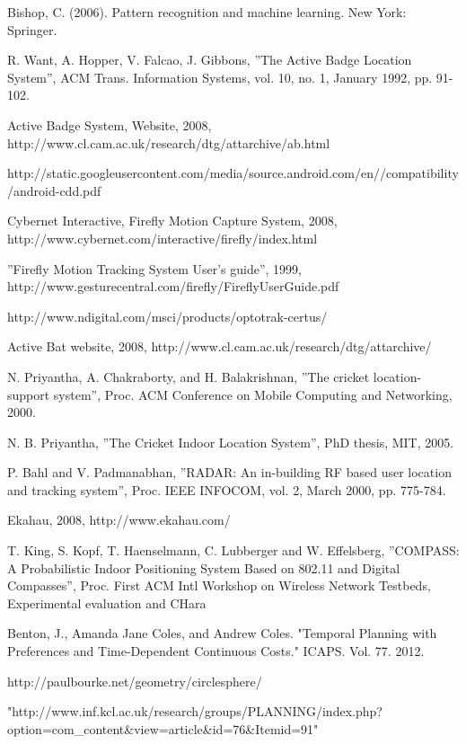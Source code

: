 \documentclass[12pt]{informatics-report}
\begin{document}
\begin{thebibliography}{99}
 Bishop, C. (2006). Pattern recognition and machine learning. New York: Springer.

 R. Want, A. Hopper, V. Falcao, J. Gibbons, ”The Active Badge Location System”, ACM Trans. Information Systems, vol. 10, no. 1, January 1992, pp. 91-102.

 Active Badge System, Website, 2008, http://www.cl.cam.ac.uk/research/dtg/attarchive/ab.html

 http://static.googleusercontent.com/media/source.android.com/en//compatibility/android-cdd.pdf

 Cybernet Interactive, Firefly Motion Capture System, 2008, http://www.cybernet.com/interactive/firefly/index.html 

 ”Firefly Motion Tracking System User’s guide”, 1999, http://www.gesturecentral.com/firefly/FireflyUserGuide.pdf

 http://www.ndigital.com/msci/products/optotrak-certus/

 Active Bat website, 2008, http://www.cl.cam.ac.uk/research/dtg/attarchive/

 N. Priyantha, A. Chakraborty, and H. Balakrishnan, ”The cricket location- support system”, Proc. ACM Conference on Mobile Computing and Networking, 2000. 

 N. B. Priyantha, ”The Cricket Indoor Location System”, PhD thesis, MIT, 2005.

 P. Bahl and V. Padmanabhan, ”RADAR: An in-building RF based user location and tracking system”, Proc. IEEE INFOCOM, vol. 2, March 2000, pp. 775-784.

 Ekahau, 2008, http://www.ekahau.com/

 T. King, S. Kopf, T. Haenselmann, C. Lubberger and W. Effelsberg, ”COMPASS: A Probabilistic Indoor Positioning System Based on 802.11 and Digital Compasses”, Proc. First ACM Intl Workshop on Wireless Network Testbeds, Experimental evaluation and CHara

 Benton, J., Amanda Jane Coles, and Andrew Coles. "Temporal Planning with Preferences and Time-Dependent Continuous Costs." ICAPS. Vol. 77. 2012.

 http://paulbourke.net/geometry/circlesphere/


 "http://www.inf.kcl.ac.uk/research/groups/PLANNING/index.php?option=com\_content\&view=article\&id=76\&Itemid=91"


\end{thebibliography}
\end{document}
